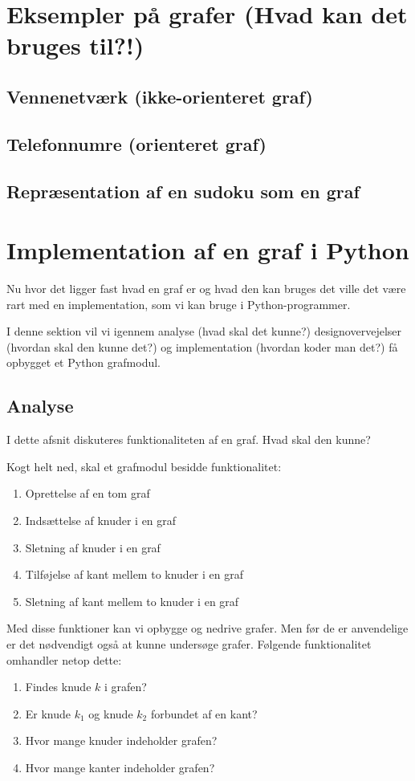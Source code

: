 \documentclass[10pt,a4paper,danish]{article}
\begin{document}
\section{Eksempler på grafer (Hvad kan det bruges til?!)}
\subsection{Vennenetværk (ikke-orienteret graf)}
\subsection{Telefonnumre (orienteret graf)}
\subsection{Repræsentation af en sudoku som en graf}


\section{Implementation af en graf i Python}
Nu hvor det ligger fast hvad en graf er og hvad den kan bruges det
ville det være rart med en implementation, som vi kan bruge i
Python-programmer.

I denne sektion vil vi igennem analyse (hvad skal det kunne?)
designovervejelser (hvordan skal den kunne det?) og implementation
(hvordan koder man det?) få opbygget et Python grafmodul.

\subsection{Analyse}
\label{sec:analyse}
I dette afsnit diskuteres funktionaliteten af en graf. Hvad skal den
kunne?

Kogt helt ned, skal et grafmodul besidde funktionalitet:
\begin{enumerate}
\item Oprettelse af en tom graf
\item Indsættelse af knuder i en graf
\item Sletning af knuder i en graf
\item Tilføjelse af kant mellem to knuder i en graf
\item Sletning af kant mellem to knuder i en graf
\end{enumerate}

Med disse funktioner kan vi opbygge og nedrive grafer. Men før de er
anvendelige er det nødvendigt også at kunne undersøge grafer. Følgende
funktionalitet omhandler netop dette:
\begin{enumerate}
\item Findes knude $k$ i grafen?
\item Er knude $k_1$ og knude $k_2$ forbundet af en kant?
\item Hvor mange knuder indeholder grafen?
\item Hvor mange kanter indeholder grafen?
\end{enumerate}
\end{document}

